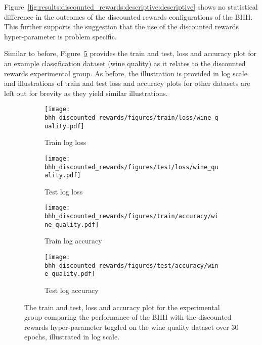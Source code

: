Figure~\ref{fig:results:discounted_rewards:descriptive:descriptive} shows no statistical difference in the outcomes of the discounted rewards configurations of the \acs{BHH}. This further supports the suggestion that the use of the discounted rewards hyper-parameter is problem specific.

Similar to before, Figure~\ref{fig:results:discounted_rewards:figures:wine_quality} provides the train and test, loss and accuracy plot for an example classification dataset (wine quality) as it relates to the discounted rewards experimental group. As before, the illustration is provided in log scale and illustrations of train and test loss and accuracy plots for other datasets are left out for brevity as they yield similar illustrations.

\begin{figure}[htbp]
	\begin{subfigure}{0.5\textwidth}
		\centering
		\texttt{[image: bhh\_discounted\_rewards/figures/train/loss/wine\_quality.pdf]}
		\caption{Train log loss}
		\label{fig:results:discounted_rewards:figures:loss:train:wine_quality}
	\end{subfigure}
	\begin{subfigure}{0.5\textwidth}
		\centering
		\texttt{[image: bhh\_discounted\_rewards/figures/test/loss/wine\_quality.pdf]}
		\caption{Test log loss}
		\label{fig:results:discounted_rewards:figures:loss:test:wine_quality}
	\end{subfigure}
	\par\bigskip
	\begin{subfigure}{0.5\textwidth}
		\centering
		\texttt{[image: bhh\_discounted\_rewards/figures/train/accuracy/wine\_quality.pdf]}
		\caption{Train log accuracy}
		\label{fig:results:discounted_rewards:figures:accuracy:train:wine_quality}
	\end{subfigure}
	\begin{subfigure}{0.5\textwidth}
		\centering
		\texttt{[image: bhh\_discounted\_rewards/figures/test/accuracy/wine\_quality.pdf]}
		\caption{Test log accuracy}
		\label{fig:results:discounted_rewards:figures:accuracy:test:wine_quality}
	\end{subfigure}
	\par\bigskip
	\caption{The train and test, loss and accuracy plot for the experimental group comparing the performance of the \acs{BHH} with the discounted rewards hyper-parameter toggled on the wine quality dataset over 30 epochs, illustrated in log scale.}
	\label{fig:results:discounted_rewards:figures:wine_quality}
\end{figure}

